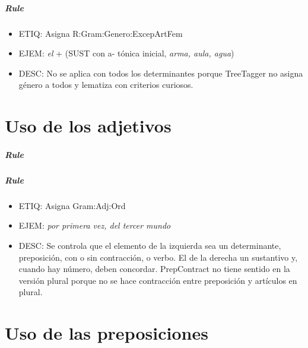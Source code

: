 \documentclass[11pt]{report}
\begin{document}
\paragraph*{Rule}
\begin{itemize}
\item ETIQ: Asigna R:Gram:Genero:ExcepArtFem
\item EJEM: \emph{el} + (SUST con a- tónica inicial, \emph{arma, aula, agua})
\item DESC: No se aplica con todos los determinantes porque TreeTagger no asigna género a todos y lematiza con criterios curiosos.
\end{itemize}

\chapter{Uso de los adjetivos}
\paragraph*{Rule}
\paragraph*{Rule}
\begin{itemize}
\item ETIQ: Asigna Gram:Adj:Ord
\item EJEM: \emph{por primera vez, del tercer mundo} 
\item DESC: Se controla que el elemento de la izquierda sea un determinante, preposición, con o sin contracción, o verbo. El de la derecha un sustantivo y, cuando hay número, deben concordar. PrepContract no tiene sentido en la versión plural porque no se hace contracción entre preposición y artículos en plural.
\end{itemize}

\chapter{Uso de las preposiciones}
\end{document}
